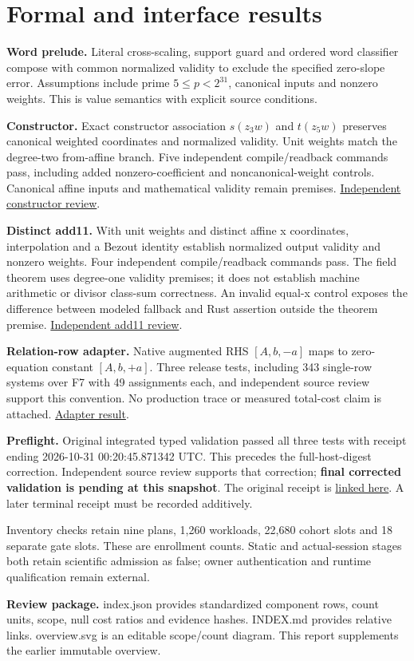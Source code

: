 \documentclass[11pt]{article}
\begin{document}
\newpage
\section*{Formal and interface results}
\textbf{Word prelude.} Literal cross-scaling, support guard and ordered word classifier compose with common normalized validity to exclude the specified zero-slope error. Assumptions include prime $5\le p<2^{31}$, canonical inputs and nonzero weights. This is value semantics with explicit source conditions.

\textbf{Constructor.} Exact constructor association $s(z_3w)$ and $t(z_5w)$ preserves canonical weighted coordinates and normalized validity. Unit weights match the degree-two from-affine branch. Five independent compile/readback commands pass, including added nonzero-coefficient and noncanonical-weight controls. Canonical affine inputs and mathematical validity remain premises. \href{../packets/constructor-review/review.json}{Independent constructor review}.

\textbf{Distinct add11.} With unit weights and distinct affine x coordinates, interpolation and a Bezout identity establish normalized output validity and nonzero weights. Four independent compile/readback commands pass. The field theorem uses degree-one validity premises; it does not establish machine arithmetic or divisor class-sum correctness. An invalid equal-x control exposes the difference between modeled fallback and Rust assertion outside the theorem premise. \href{../packets/add11-distinct-review/review.json}{Independent add11 review}.

\textbf{Relation-row adapter.} Native augmented RHS $[A,b,-a]$ maps to zero-equation constant $[A,b,+a]$. Three release tests, including 343 single-row systems over F7 with 49 assignments each, and independent source review support this convention. No production trace or measured total-cost claim is attached. \href{../relation-adapter/report/result.json}{Adapter result}.

\textbf{Preflight.} Original integrated typed validation passed all three tests with receipt ending 2026-10-31 00:20:45.871342 UTC. This precedes the full-host-digest correction. Independent source review supports that correction; \textbf{final corrected validation is pending at this snapshot}. The original receipt is \href{../preflight-review/typed-tests/receipt.json}{linked here}. A later terminal receipt must be recorded additively.

Inventory checks retain nine plans, 1,260 workloads, 22,680 cohort slots and 18 separate gate slots. These are enrollment counts. Static and actual-session stages both retain scientific admission as false; owner authentication and runtime qualification remain external.

\textbf{Review package.} index.json provides standardized component rows, count units, scope, null cost ratios and evidence hashes. INDEX.md provides relative links. overview.svg is an editable scope/count diagram. This report supplements the earlier immutable overview.
\end{document}
